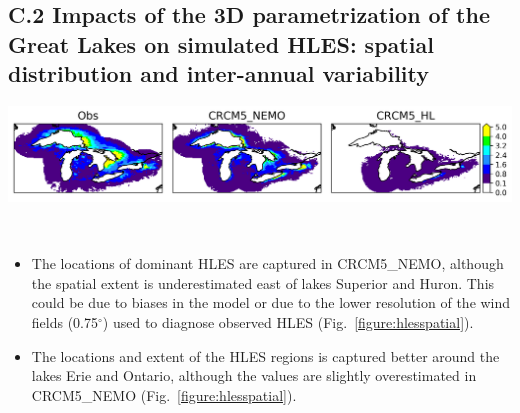 \documentclass[a0b,landscape]{a0poster}
\begin{document}
\begin{multicols*}{4}
\subsection*{C.2 Impacts of the 3D parametrization of the Great Lakes on simulated HLES: spatial distribution and inter-annual variability}
\noindent
\begin{minipage}{\linewidth}
  \center
  \includegraphics[width=\linewidth]{figures/hles_clim_NDJ}
\end{minipage} \\[0.5cm]


\begin{itemize}
  \item The locations of dominant HLES are captured in CRCM5\_NEMO, although the spatial extent is underestimated east of lakes Superior and Huron.
        This could be due to biases in the model or due to the lower resolution of the wind fields (0.75$^\circ$) used to diagnose observed HLES (Fig.~\ref{figure:hlesspatial}).
  \item The locations and extent of the HLES regions is captured better around the lakes Erie and Ontario, although the values are slightly overestimated in
        CRCM5\_NEMO (Fig.~\ref{figure:hlesspatial}).
\end{itemize}




\end{multicols*}
\end{document}
